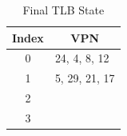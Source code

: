 \begin{parts}
     \begin{table}[ht]
        \centering
        \caption{Final TLB State}
        \label{tab:tlb_state_2}
        \renewcommand{\arraystretch}{1.5} 
        \begin{tabular}{|c|p{5cm}|} %
        \hline %
        \multicolumn{1}{|c|}{\textbf{Index}} & \multicolumn{1}{c|}{\textbf{VPN}} \\ 
        \hline
        0 & 24, 4, 8, 12\\ \hline
        1 & 5, 29, 21, 17\\ \hline
        2 & \\ \hline
        3 & \\ \hline
        \end{tabular}
    \end{table}


\end{parts}